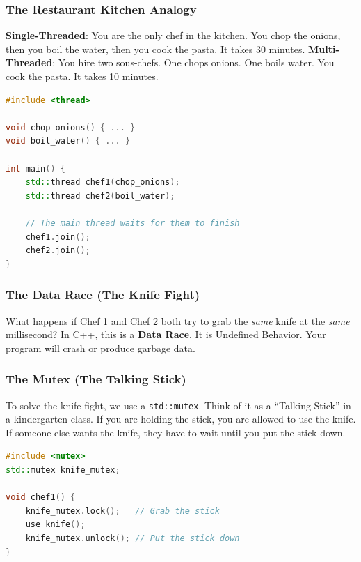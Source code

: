 \hypertarget{the-restaurant-kitchen-analogy}{%
\subsubsection{The Restaurant Kitchen
Analogy}\label{the-restaurant-kitchen-analogy}}

\textbf{Single-Threaded}: You are the only chef in the kitchen. You chop
the onions, then you boil the water, then you cook the pasta. It takes
30 minutes. \textbf{Multi-Threaded}: You hire two sous-chefs. One chops
onions. One boils water. You cook the pasta. It takes 10 minutes.

\begin{lstlisting}[language={C++}]
#include <thread>

void chop_onions() { ... }
void boil_water() { ... }

int main() {
    std::thread chef1(chop_onions);
    std::thread chef2(boil_water);
    
    // The main thread waits for them to finish
    chef1.join(); 
    chef2.join();
}
\end{lstlisting}

\hypertarget{the-data-race-the-knife-fight}{%
\subsubsection{The Data Race (The Knife
Fight)}\label{the-data-race-the-knife-fight}}

What happens if Chef 1 and Chef 2 both try to grab the \emph{same} knife
at the \emph{same} millisecond? In C++, this is a \textbf{Data Race}. It
is Undefined Behavior. Your program will crash or produce garbage data.

\hypertarget{the-mutex-the-talking-stick}{%
\subsubsection{The Mutex (The Talking
Stick)}\label{the-mutex-the-talking-stick}}

To solve the knife fight, we use a \passthrough{\lstinline!std::mutex!}.
Think of it as a ``Talking Stick'' in a kindergarten class. If you are
holding the stick, you are allowed to use the knife. If someone else
wants the knife, they have to wait until you put the stick down.

\begin{lstlisting}[language={C++}]
#include <mutex>
std::mutex knife_mutex;

void chef1() {
    knife_mutex.lock();   // Grab the stick
    use_knife();
    knife_mutex.unlock(); // Put the stick down
}
\end{lstlisting}

